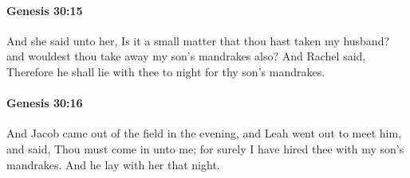		\paragraph{Genesis 30:15} %
			\label{GENESIS-30-15}

			And she said unto her, Is it a small matter that thou hast taken my husband? and wouldest thou take away my son's mandrakes also? And Rachel said, Therefore he shall lie with thee to night for thy son's mandrakes.


		\paragraph{Genesis 30:16} %
			\label{GENESIS-30-16}

			And Jacob came out of the field in the evening, and Leah went out to meet him, and said, Thou must come in unto me; for surely I have hired thee with my son's mandrakes. And he lay with her that night.

